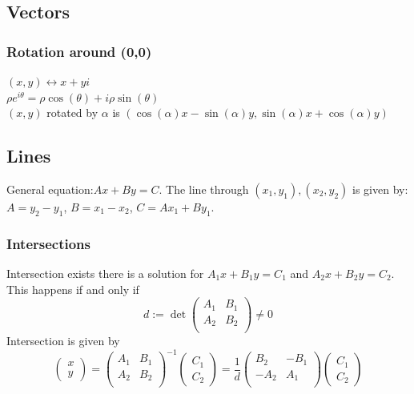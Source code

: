 \subsection{Vectors}
\subsubsection{Rotation around (0,0)}
$(x, y) \leftrightarrow x + y i$\\
$\rho e^{i\theta} = \rho \cos(\theta) + i \rho \sin(\theta)$\\

$(x, y)$ rotated by $\alpha$ is
$(\cos(\alpha) x - \sin(\alpha) y, \sin(\alpha)  x + \cos(\alpha) y)$


\subsection{Lines}
General equation:$Ax + By = C$. The line through $(x_1, y_1), (x_2, y_2)$ is given by: $A = y_2 - y_1$, $B = x_1 - x_2$, $C = A x_1 + B y_1$.
\subsubsection{Intersections}
Intersection exists there is a solution for $A_1 x + B_1 y = C_1$ and $A_2 x + B_2 y = C_2$. This happens if and only if $$d := \det \begin{pmatrix}
A_1 & B_1 \\
A_2 & B_2 \\
\end{pmatrix} \neq 0$$
Intersection is given by
$$\begin{pmatrix}
x\\
y
\end{pmatrix} = 
\begin{pmatrix}
A_1 & B_1 \\
A_2 & B_2 \\
\end{pmatrix}^{-1} 
\begin{pmatrix}
C_1 \\
C_2
\end{pmatrix}
=
\frac{1}{d}
\begin{pmatrix}
B_2 & -B_1 \\
-A_2 & A_1 \\
\end{pmatrix} 
\begin{pmatrix}
C_1 \\
C_2
\end{pmatrix}
$$
